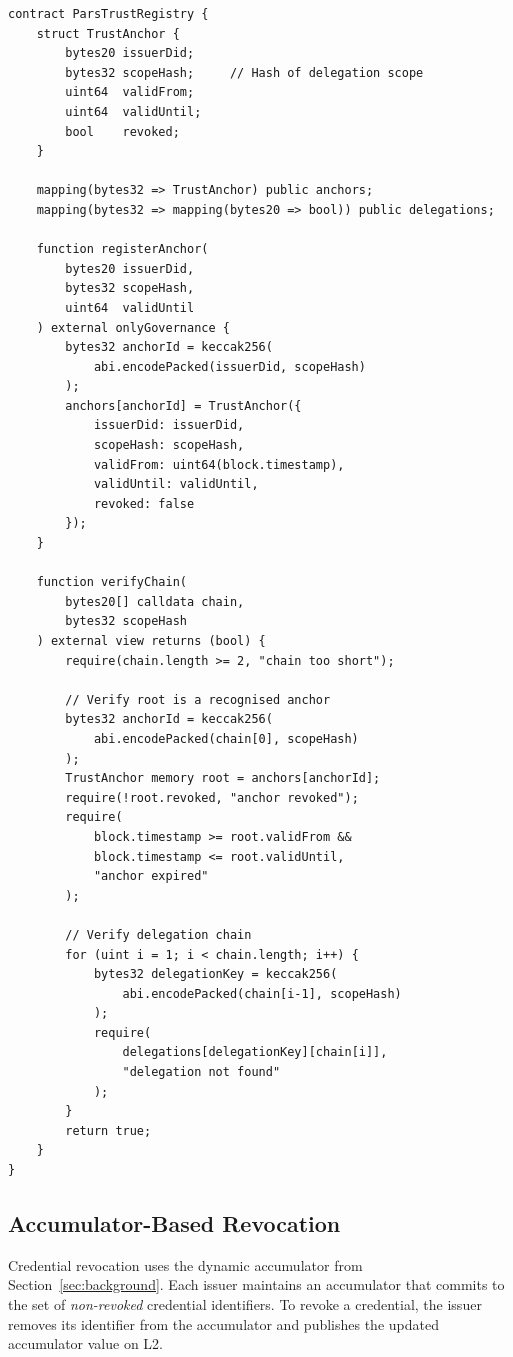 \documentclass[11pt,a4paper]{article}
\begin{document}
\begin{lstlisting}[language=Solidity,caption={Trust Registry contract}]
contract ParsTrustRegistry {
    struct TrustAnchor {
        bytes20 issuerDid;
        bytes32 scopeHash;     // Hash of delegation scope
        uint64  validFrom;
        uint64  validUntil;
        bool    revoked;
    }

    mapping(bytes32 => TrustAnchor) public anchors;
    mapping(bytes32 => mapping(bytes20 => bool)) public delegations;

    function registerAnchor(
        bytes20 issuerDid,
        bytes32 scopeHash,
        uint64  validUntil
    ) external onlyGovernance {
        bytes32 anchorId = keccak256(
            abi.encodePacked(issuerDid, scopeHash)
        );
        anchors[anchorId] = TrustAnchor({
            issuerDid: issuerDid,
            scopeHash: scopeHash,
            validFrom: uint64(block.timestamp),
            validUntil: validUntil,
            revoked: false
        });
    }

    function verifyChain(
        bytes20[] calldata chain,
        bytes32 scopeHash
    ) external view returns (bool) {
        require(chain.length >= 2, "chain too short");

        // Verify root is a recognised anchor
        bytes32 anchorId = keccak256(
            abi.encodePacked(chain[0], scopeHash)
        );
        TrustAnchor memory root = anchors[anchorId];
        require(!root.revoked, "anchor revoked");
        require(
            block.timestamp >= root.validFrom &&
            block.timestamp <= root.validUntil,
            "anchor expired"
        );

        // Verify delegation chain
        for (uint i = 1; i < chain.length; i++) {
            bytes32 delegationKey = keccak256(
                abi.encodePacked(chain[i-1], scopeHash)
            );
            require(
                delegations[delegationKey][chain[i]],
                "delegation not found"
            );
        }
        return true;
    }
}
\end{lstlisting}

\subsection{Accumulator-Based Revocation}

Credential revocation uses the dynamic accumulator from Section~\ref{sec:background}.
Each issuer maintains an accumulator that commits to the set of \emph{non-revoked}
credential identifiers. To revoke a credential, the issuer removes its identifier
from the accumulator and publishes the updated accumulator value on L2.
\end{document}
